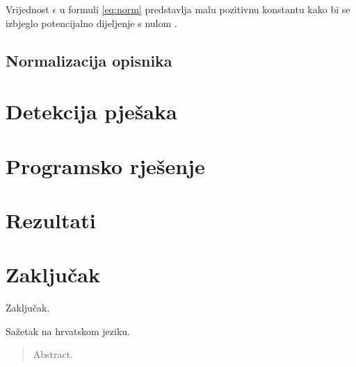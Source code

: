 \documentclass[times, utf8, zavrsni]{fer}
\begin{document}
Vrijednost $\epsilon$ u formuli \ref{eq:norm} predstavlja malu pozitivnu konstantu kako bi se izbjeglo potencijalno dijeljenje s nulom \citep{tomasi2012histograms}.

\section{Normalizacija opisnika}

\chapter{Detekcija pješaka}

\chapter{Programsko rješenje}

\chapter{Rezultati}

\chapter{Zaključak}
Zaključak.




\begin{sazetak}
Sažetak na hrvatskom jeziku.

\end{sazetak}

\begin{abstract}
Abstract.

\end{abstract}
\end{document}
